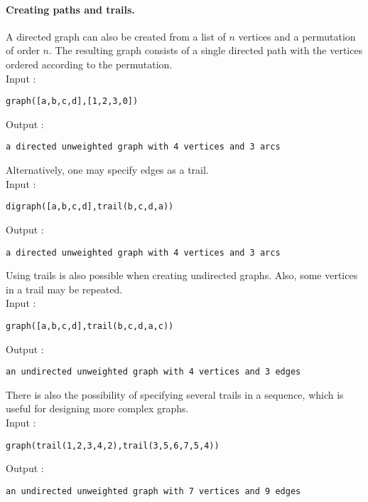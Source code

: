 \documentclass[a4paper,11pt]{article}
\begin{document}
\paragraph{Creating paths and trails.}
A directed graph can also be created from a list of $ n $ vertices and a permutation of order $ n $. The resulting graph consists of a single directed path with the vertices ordered according to the permutation.\\
Input :
\begin{center}
  \tt graph([a,b,c,d],[1,2,3,0])
\end{center}
Output :
\begin{center}
  \tt a directed unweighted graph with 4 vertices and 3 arcs
\end{center}
Alternatively, one may specify edges as a trail.\\
Input :
\begin{center}
  \tt digraph([a,b,c,d],trail(b,c,d,a))
\end{center}
Output :
\begin{center}
  \tt a directed unweighted graph with 4 vertices and 3 arcs
\end{center}
Using trails is also possible when creating undirected graphs. Also, some vertices in a trail may be repeated.\\
Input :
\begin{center}
  \tt graph([a,b,c,d],trail(b,c,d,a,c))
\end{center}
Output :
\begin{center}
  \tt an undirected unweighted graph with 4 vertices and 3 edges
\end{center}
There is also the possibility of specifying several trails in a sequence, which is useful for designing more complex graphs.\\
Input :
\begin{center}
  \tt graph(trail(1,2,3,4,2),trail(3,5,6,7,5,4))
\end{center}
Output :
\begin{center}
  \tt an undirected unweighted graph with 7 vertices and 9 edges
\end{center}
\end{document}
